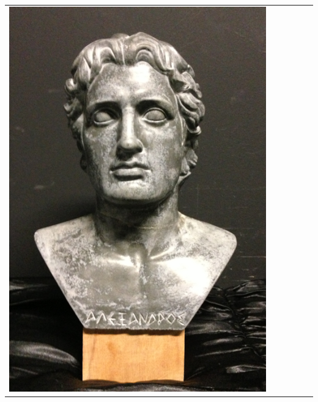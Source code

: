 \documentclass[final,12pt,3p]{elsarticle}
\begin{document}
\begin{table}
{\begin{tabular}{| c |  m{0.8cm} | m{0.8cm} | c | c | c |}
	\includegraphics[scale=0.05]{./alex_real.png} & 

\end{tabular}}
\end{table}
\end{document}
